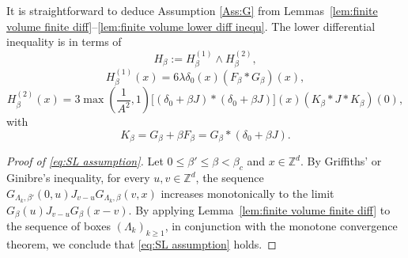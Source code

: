 \documentclass[11pt,a4paper]{article}
\numberwithin{equation}{section}
\theoremstyle{plain}
\theoremstyle{definition}
\newcommand\1{\mathds{1}}
\begin{document}
It is straightforward to deduce Assumption \ref{Ass:G} from
Lemmas~\ref{lem:finite volume finite diff}--\ref{lem:finite volume lower diff inequ}.
The lower differential inequality is in terms of
\begin{equation}
\label{eq:Hphi4}
    H_\beta:=H^{(1)}_\beta\wedge H^{(2)}_\beta,
\end{equation}
 \begin{equation}\label{eq:expression H1 spins}
 	H^{(1)}_\beta(x)=6\lambda \delta_0(x)(F_\beta*G_\beta)(x),
 \end{equation}
  \begin{equation}\label{eq:expression H2 spins}
H^{(2)}_\beta(x)=3\max \left(\frac{1}{A^2},1\right)
\big[(\delta_0+\beta J)*(\delta_0+\beta J)\big] (x)(K_\beta*J*K_\beta)(0),
\end{equation}
with
\begin{equation}
    K_\beta=G_\beta+\beta F_\beta=G_\beta*(\delta_0+\beta J).
\end{equation}

\begin{proof}[Proof of \eqref{eq:SL assumption}]
Let $0\leq \beta'\leq \beta<\beta_c$ and $x\in \mathbb Z^d$. By Griffiths' or Ginibre's inequality, for every $u,v\in \mathbb Z^d$, the sequence $G_{\Lambda_k,\beta'}(0,u)J_{v-u}
    G_{\Lambda_k,\beta}(v,x)$ increases monotonically to the limit $G_\beta(u)J_{v-u}G_\beta(x-v)$.
By applying Lemma~\ref{lem:finite volume finite diff} to the sequence of boxes $(\Lambda_k)_{k\geq 1}$, in conjunction with the monotone convergence theorem, we conclude
that  \eqref{eq:SL assumption} holds.
\end{proof}
\end{document}
